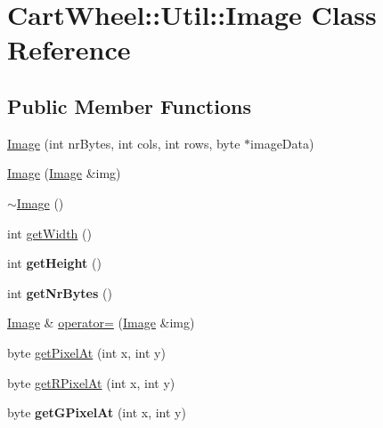 \hypertarget{classCartWheel_1_1Util_1_1Image}{
\section{CartWheel::Util::Image Class Reference}
\label{classCartWheel_1_1Util_1_1Image}
}
\subsection*{Public Member Functions}
\begin{DoxyCompactItemize}
\item 
\hyperlink{classCartWheel_1_1Util_1_1Image_aaec45fba96236c8c7509e48d786ad653}{Image} (int nrBytes, int cols, int rows, byte $\ast$imageData)
\item 
\hyperlink{classCartWheel_1_1Util_1_1Image_ad9a2ebd07a4f458ba24d91af0122418e}{Image} (\hyperlink{classCartWheel_1_1Util_1_1Image}{Image} \&img)
\item 
\hyperlink{classCartWheel_1_1Util_1_1Image_a0294f63700543e11c0f0da85601c7ae5}{$\sim$Image} ()
\item 
int \hyperlink{classCartWheel_1_1Util_1_1Image_a025c1f28ff56adced27cfce64c20cabb}{getWidth} ()
\item 
\hypertarget{classCartWheel_1_1Util_1_1Image_a25e76dc2bc2f1c1423c855378b28044f}{
int {\bfseries getHeight} ()}
\label{classCartWheel_1_1Util_1_1Image_a25e76dc2bc2f1c1423c855378b28044f}

\item 
\hypertarget{classCartWheel_1_1Util_1_1Image_adb4ea6e0f51710eca49b83b1b4932a7d}{
int {\bfseries getNrBytes} ()}
\label{classCartWheel_1_1Util_1_1Image_adb4ea6e0f51710eca49b83b1b4932a7d}

\item 
\hyperlink{classCartWheel_1_1Util_1_1Image}{Image} \& \hyperlink{classCartWheel_1_1Util_1_1Image_a37cec65e812b5e63ac60a87f492fe512}{operator=} (\hyperlink{classCartWheel_1_1Util_1_1Image}{Image} \&img)
\item 
byte \hyperlink{classCartWheel_1_1Util_1_1Image_a2586cc3cee4706b46c18e68cd5b77ced}{getPixelAt} (int x, int y)
\item 
byte \hyperlink{classCartWheel_1_1Util_1_1Image_a2280436db038ab38d89e3bf329e6f8b1}{getRPixelAt} (int x, int y)
\item 
\hypertarget{classCartWheel_1_1Util_1_1Image_ad4f3881b586ecec5fd3bee61e89af01c}{
byte {\bfseries getGPixelAt} (int x, int y)}
\label{classCartWheel_1_1Util_1_1Image_ad4f3881b586ecec5fd3bee61e89af01c}


\end{DoxyCompactItemize}
